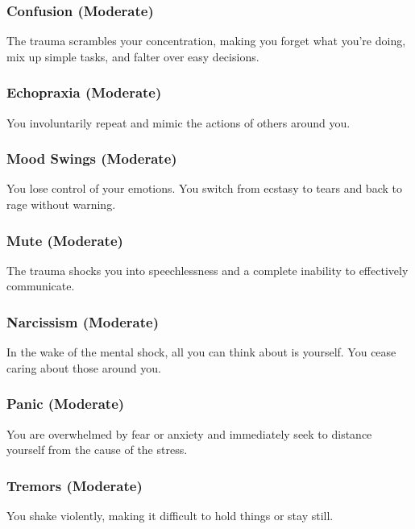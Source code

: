 \subsubsection{Confusion (Moderate)}

The trauma scrambles your concentration, making 
you forget what you're doing, mix up simple tasks, 
and falter over easy decisions.

\subsubsection{Echopraxia (Moderate)}

You involuntarily repeat and mimic the actions of 
others around you.

\subsubsection{Mood Swings (Moderate)}

You lose control of your emotions. You switch from 
ecstasy to tears and back to rage without warning.

\subsubsection{Mute (Moderate)}

The trauma shocks you into speechlessness and a complete
inability to effectively communicate.

\subsubsection{Narcissism (Moderate)}

In the wake of the mental shock, all you can think about 
is yourself. You cease caring about those around you.

\subsubsection{Panic (Moderate)}

You are overwhelmed by fear or anxiety and immediately
seek to distance yourself from the cause of the stress.

\subsubsection{Tremors (Moderate)}

You shake violently, making it difficult to hold things 
or stay still.

